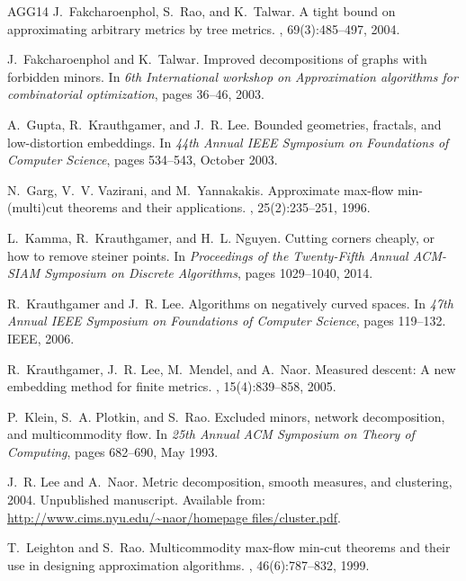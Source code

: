 \documentclass[11pt,fleqn]{article}
\begin{document}
\begin{thebibliography}{AGG{\etalchar{+}}14}
J.~Fakcharoenphol, S.~Rao, and K.~Talwar.
\newblock A tight bound on approximating arbitrary metrics by tree metrics.
, 69(3):485--497, 2004.

J.~Fakcharoenphol and K.~Talwar.
\newblock Improved decompositions of graphs with forbidden minors.
\newblock In {\em 6th International workshop on Approximation algorithms for
  combinatorial optimization}, pages 36--46, 2003.

A.~Gupta, R.~Krauthgamer, and J.~R. Lee.
\newblock Bounded geometries, fractals, and low-distortion embeddings.
\newblock In {\em 44th Annual IEEE Symposium on Foundations of Computer
  Science}, pages 534--543, October 2003.

N.~Garg, V.~V. Vazirani, and M.~Yannakakis.
\newblock Approximate max-flow min-(multi)cut theorems and their applications.
, 25(2):235--251, 1996.

L.~Kamma, R.~Krauthgamer, and H.~L. Nguyen.
\newblock Cutting corners cheaply, or how to remove steiner points.
\newblock In {\em Proceedings of the Twenty-Fifth Annual ACM-SIAM Symposium on
  Discrete Algorithms}, pages 1029--1040, 2014.

R.~Krauthgamer and J.~R. Lee.
\newblock Algorithms on negatively curved spaces.
\newblock In {\em 47th Annual IEEE Symposium on Foundations of Computer
  Science}, pages 119--132. IEEE, 2006.

R.~Krauthgamer, J.~R. Lee, M.~Mendel, and A.~Naor.
\newblock Measured descent: {A} new embedding method for finite metrics.
, 15(4):839--858, 2005.

P.~Klein, S.~A. Plotkin, and S.~Rao.
\newblock Excluded minors, network decomposition, and multicommodity flow.
\newblock In {\em 25th Annual ACM Symposium on Theory of Computing}, pages
  682--690, May 1993.

J.~R. Lee and A.~Naor.
\newblock Metric decomposition, smooth measures, and clustering, 2004.
\newblock Unpublished manuscript.
\newblock Available from: \url{http://www.cims.nyu.edu/~naor/homepage
  files/cluster.pdf}.

T.~Leighton and S.~Rao.
\newblock Multicommodity max-flow min-cut theorems and their use in designing
  approximation algorithms.
, 46(6):787--832, 1999.


\end{thebibliography}
\end{document}
